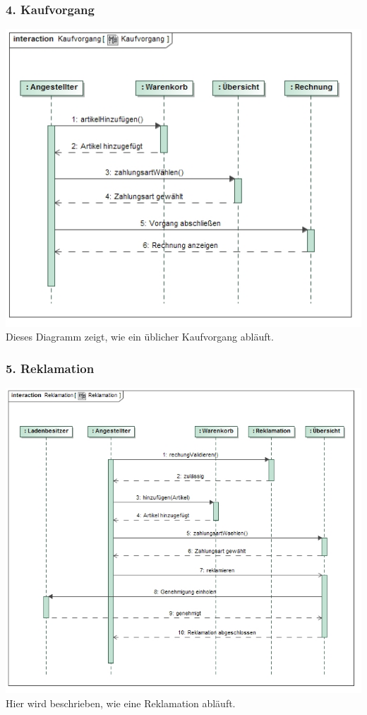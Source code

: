 \documentclass[pdftex,12pt,a4paper]{article}
\begin{document}
\subsubsection*{4. Kaufvorgang}
\includegraphics[width=1\textwidth]{./images/kaufvorgang}
Dieses Diagramm zeigt, wie ein \"ublicher Kaufvorgang abl\"auft.
\subsubsection*{5. Reklamation}
\includegraphics[width=1\textwidth]{./images/reklamation}
Hier wird beschrieben, wie eine Reklamation abl\"auft.
\end{document}
